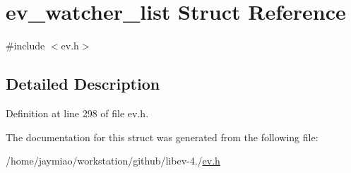 \hypertarget{structev__watcher__list}{\section{ev\-\_\-watcher\-\_\-list \-Struct \-Reference}
\label{structev__watcher__list}
}


{\ttfamily \#include $<$ev.\-h$>$}



\subsection{\-Detailed \-Description}


\-Definition at line 298 of file ev.\-h.



\-The documentation for this struct was generated from the following file\-:\begin{DoxyCompactItemize}
\item 
/home/jaymiao/workstation/github/libev-\/4./\hyperlink{ev_8h}{ev.\-h}\end{DoxyCompactItemize}

